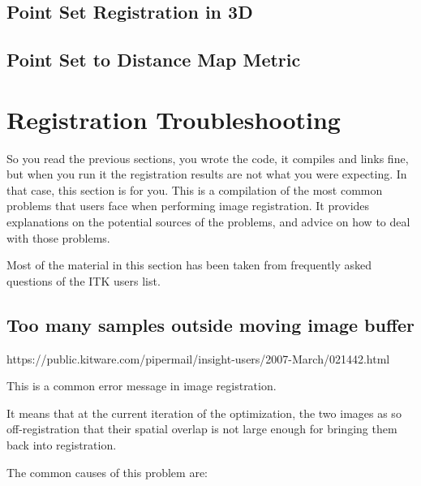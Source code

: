




\subsection{Point Set Registration in 3D}
\label{sec:PointSetRegistrationIn3D}





\subsection{Point Set to Distance Map Metric}
\label{sec:PointSetToDistanceMapMetric}





\section{Registration Troubleshooting}
So you read the previous sections, you wrote the code, it compiles and links fine,
but when you run it the registration results are not what you were expecting.
In that case, this section is for you. This is a compilation of the most common
problems that users face when performing image registration. It provides explanations
on the potential sources of the problems, and advice on how to deal with those problems.

Most of the material in this section has been taken from frequently asked questions of
the ITK users list.


\subsection{Too many samples outside moving image buffer}


https://public.kitware.com/pipermail/insight-users/2007-March/021442.html

This is a common error message in image registration.

It means that at the current iteration of the optimization,
the two images as so off-registration that their spatial
overlap is not large enough for bringing them back into
registration.

The common causes of this problem are:

